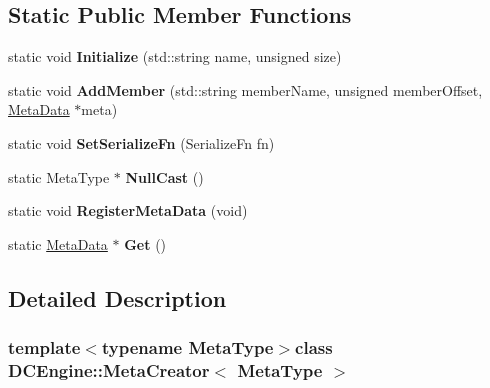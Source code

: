 \subsection*{Static Public Member Functions}
\begin{DoxyCompactItemize}
\item 
\hypertarget{classDCEngine_1_1MetaCreator_a52a5478d81f6a8897723a0ebb5bd5c0e}{static void {\bfseries Initialize} (std\-::string name, unsigned size)}\label{classDCEngine_1_1MetaCreator_a52a5478d81f6a8897723a0ebb5bd5c0e}

\item 
\hypertarget{classDCEngine_1_1MetaCreator_a35e052df6adab3e082b00e9a48d4efc6}{static void {\bfseries Add\-Member} (std\-::string member\-Name, unsigned member\-Offset, \hyperlink{classDCEngine_1_1MetaData}{Meta\-Data} $\ast$meta)}\label{classDCEngine_1_1MetaCreator_a35e052df6adab3e082b00e9a48d4efc6}

\item 
\hypertarget{classDCEngine_1_1MetaCreator_a59885cf5941b54d5c694fa98a1732353}{static void {\bfseries Set\-Serialize\-Fn} (Serialize\-Fn fn)}\label{classDCEngine_1_1MetaCreator_a59885cf5941b54d5c694fa98a1732353}

\item 
\hypertarget{classDCEngine_1_1MetaCreator_abf6d80cfc9440defaad20c2decaca1da}{static Meta\-Type $\ast$ {\bfseries Null\-Cast} ()}\label{classDCEngine_1_1MetaCreator_abf6d80cfc9440defaad20c2decaca1da}

\item 
\hypertarget{classDCEngine_1_1MetaCreator_a573c8398cb94fb4b236833f6717853d0}{static void {\bfseries Register\-Meta\-Data} (void)}\label{classDCEngine_1_1MetaCreator_a573c8398cb94fb4b236833f6717853d0}

\item 
\hypertarget{classDCEngine_1_1MetaCreator_a9114694db9c6c4bcda4191e2c84085c1}{static \hyperlink{classDCEngine_1_1MetaData}{Meta\-Data} $\ast$ {\bfseries Get} ()}\label{classDCEngine_1_1MetaCreator_a9114694db9c6c4bcda4191e2c84085c1}

\end{DoxyCompactItemize}


\subsection{Detailed Description}
\subsubsection*{template$<$typename Meta\-Type$>$class D\-C\-Engine\-::\-Meta\-Creator$<$ Meta\-Type $>$}

